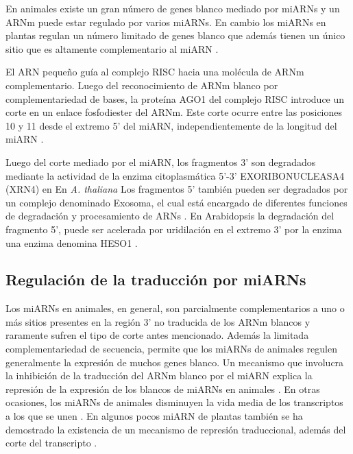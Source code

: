 En animales existe un gran número de genes blanco mediado por miARNs y un ARNm puede estar regulado por varios miARNs.
En cambio los miARNs en plantas regulan un número limitado de genes blanco que además tienen un único sitio que es altamente complementario al miARN \citep{Voinnet2009669}.

El ARN pequeño guía al complejo RISC hacia una molécula de ARNm complementario. 
Luego del reconocimiento de ARNm blanco por complementariedad de bases, la proteína AGO1 del complejo RISC introduce un corte en un enlace fosfodiester del ARNm.
Este corte ocurre entre las posiciones 10 y 11 desde el extremo 5' del miARN, independientemente de la longitud del miARN \citep{Mallory2004,Llave2002,pmid12931144,Xie2003,pmid15057819}.

Luego del corte mediado por el miARN, los fragmentos 3' son degradados  mediante la actividad de la enzima citoplasmática 5'-3' EXORIBONUCLEASA4 (XRN4) en En \textit{A. thaliana}  \citep{pmid15260969}
Los fragmentos 5' también pueden ser degradados por un complejo denominado Exosoma, el cual está encargado de diferentes funciones de degradación y procesamiento de ARNs \citep{pmid18160042}.
En Arabidopsis la degradación del fragmento 5', puede ser acelerada por uridilación en el extremo 3' por la enzima una enzima denomina HESO1 \citep{pmid24733911}.

\subsection{Regulación de la traducción por miARNs}

Los miARNs en animales, en general, son parcialmente complementarios a uno o más sitios presentes en la región 3' no traducida de los ARNm blancos \citep{pmid12869753,pmid8252621,Fabian} y raramente sufren el tipo de corte antes mencionado. 
Además la limitada complementariedad de secuencia, permite que los miARNs de animales regulen generalmente la expresión de muchos genes blanco.
Un mecanismo que involucra la inhibición de la traducción del ARNm blanco por el miARN explica la represión de la expresión de los blancos de miARNs en animales \citep{Fabian}.
En otras ocasiones, los miARNs de animales disminuyen la vida media de los transcriptos a los que se unen \citep{pmid20703300}.
En algunos pocos miARN de plantas también se ha demostrado la existencia de un mecanismo de represión traduccional, además del corte del transcripto \citep{Schwab2005517,pmid19531599,pmid18392778,pmid18483398,pmid12893888,pmid14555699}.

